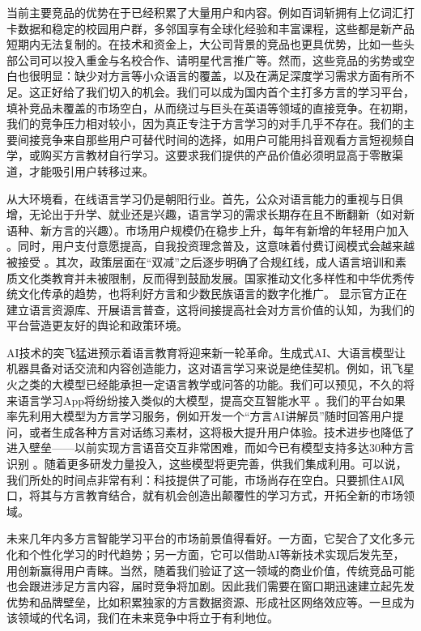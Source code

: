 当前主要竞品的优势在于已经积累了大量用户和内容。例如百词斩拥有上亿词汇打卡数据和稳定的校园用户群，多邻国享有全球化经验和丰富课程，这些都是新产品短期内无法复制的。在技术和资金上，大公司背景的竞品也更具优势，比如一些头部公司可以投入重金与名校合作、请明星代言推广等。然而，这些竞品的劣势或空白也很明显：缺少对方言等小众语言的覆盖，以及在满足深度学习需求方面有所不足。这正好给了我们切入的机会。我们可以成为国内首个主打多方言的学习平台，填补竞品未覆盖的市场空白，从而绕过与巨头在英语等领域的直接竞争。在初期，我们的竞争压力相对较小，因为真正专注于方言学习的对手几乎不存在。我们的主要间接竞争来自那些用户可替代时间的选择，如用户可能用抖音观看方言短视频自学，或购买方言教材自行学习。这要求我们提供的产品价值必须明显高于零散渠道，才能吸引用户转移过来。

从大环境看，在线语言学习仍是朝阳行业。首先，公众对语言能力的重视与日俱增，无论出于升学、就业还是兴趣，语言学习的需求长期存在且不断翻新（如对新语种、新方言的兴趣）。市场用户规模仍在稳步上升，每年有新增的年轻用户加入 。同时，用户支付意愿提高，自我投资理念普及，这意味着付费订阅模式会越来越被接受 。其次，政策层面在“双减”之后逐步明确了合规红线，成人语言培训和素质文化类教育并未被限制，反而得到鼓励发展。国家推动文化多样性和中华优秀传统文化传承的趋势，也将利好方言和少数民族语言的数字化推广。 显示官方正在建立语言资源库、开展语言普查，这将间接提高社会对方言价值的认知，为我们的平台营造更友好的舆论和政策环境。

AI技术的突飞猛进预示着语言教育将迎来新一轮革命。生成式AI、大语言模型让机器具备对话交流和内容创造能力，这对语言学习来说是绝佳契机。例如，讯飞星火之类的大模型已经能承担一定语言教学或问答的功能。我们可以预见，不久的将来语言学习App将纷纷接入类似的大模型，提高交互智能水平 。我们的平台如果率先利用大模型为方言学习服务，例如开发一个“方言AI讲解员”随时回答用户提问，或者生成各种方言对话练习素材，这将极大提升用户体验。技术进步也降低了进入壁垒——以前实现方言语音交互非常困难，而如今已有模型支持多达30种方言识别 。随着更多研发力量投入，这些模型将更完善，供我们集成利用。可以说，我们所处的时间点非常有利：科技提供了可能，市场尚存在空白。只要抓住AI风口，将其与方言教育结合，就有机会创造出颠覆性的学习方式，开拓全新的市场领域。

未来几年内多方言智能学习平台的市场前景值得看好。一方面，它契合了文化多元化和个性化学习的时代趋势；另一方面，它可以借助AI等新技术实现后发先至，用创新赢得用户青睐。当然，随着我们验证了这一领域的商业价值，传统竞品可能也会跟进涉足方言内容，届时竞争将加剧。因此我们需要在窗口期迅速建立起先发优势和品牌壁垒，比如积累独家的方言数据资源、形成社区网络效应等。一旦成为该领域的代名词，我们在未来竞争中将立于有利地位。

